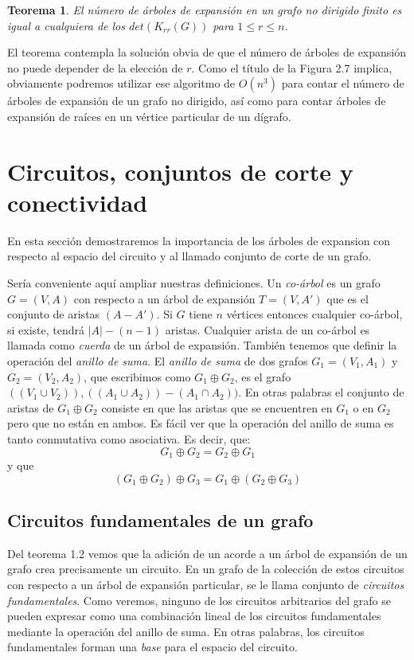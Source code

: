 \documentclass[10pt,a5paper]{book}
\newtheorem{teorema}{Teorema}[chapter]
\begin{document}
\begin{teorema}
El número de árboles de expansión en un grafo no dirigido finito es igual a cualquiera de los $det(K_{rr}(G))$ para $1\le r \le n$.
\end{teorema}

El teorema contempla la solución obvia de que el número de árboles de expansión no puede depender de la elección de $r$. Como el título de la Figura 2.7 implica, obviamente podremos utilizar ese algoritmo de $O(n^3)$ para contar el número de árboles de expansión de un grafo no dirigido, así como para contar árboles de expansión de raíces en un vértice particular de un dígrafo.

\section{Circuitos, conjuntos de corte y conectividad}
En esta sección demostraremos la importancia de los árboles de expansion con respecto al espacio del circuito y al llamado conjunto de corte de un grafo.

Sería conveniente aquí ampliar nuestras definiciones. Un \emph{co-árbol} es un grafo $G = (V,A)$ con respecto a un árbol de expansión $T = (V,A')$ que es el conjunto de aristas $(A-A')$. Si $G$ tiene $n$ vértices entonces cualquier co-árbol, si existe, tendrá $|A| - (n-1)$ aristas. Cualquier arista de un co-árbol es llamada como \emph{cuerda} de un árbol de expansión. También tenemos que definir la operación del \emph{anillo de suma}. El \emph{anillo de suma} de dos grafos $G_1 = (V_1,A_1)$ y $G_2 = (V_2,A_2)$, que escribimos como $G_1 \oplus G_2$, es el grafo $((V_1 \cup V_2)), ((A_1 \cup A_2)) - (A_1 \cap A_2))$. En otras palabras el conjunto de aristas de $G_1 \oplus G_2$ consiste en que las aristas que se encuentren en $G_1$ o en $G_2$ pero que no están en ambos. Es fácil ver que la operación del anillo de suma es tanto conmutativa como asociativa. Es decir, que:
\[ G_1 \oplus G_2 = G_2 \oplus G_1\]
y que
\[(G_1 \oplus G_2) \oplus G_3 = G_1 \oplus (G_2 \oplus G_3)\]

\subsection{Circuitos fundamentales de un grafo}
Del teorema 1.2 vemos que la adición de un acorde a un árbol de expansión de un grafo crea precisamente un circuito. En un grafo de la colección de estos circuitos con respecto a un árbol de expansión particular, se le llama conjunto de \emph{circuitos fundamentales}. Como veremos, ninguno de los circuitos arbitrarios del grafo se pueden expresar como una combinación lineal de los circuitos fundamentales mediante la operación del anillo de suma. En otras palabras, los circuitos fundamentales forman una \emph{base} para el espacio del circuito.
\end{document}
